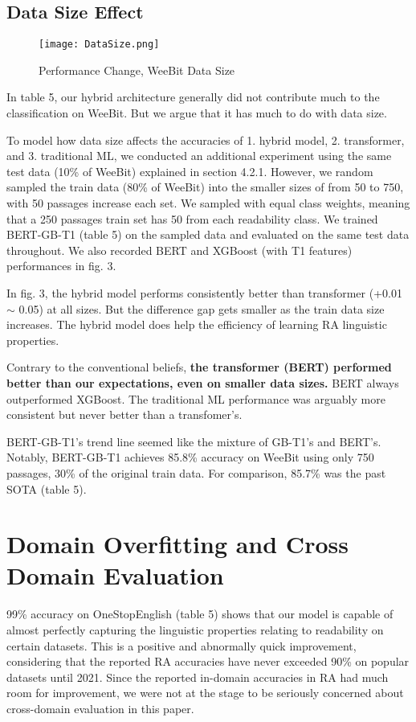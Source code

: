 \documentclass[11pt]{article}
\begin{document}
\subsection{Data Size Effect}
\begin{figure}
    \raggedright
    \texttt{[image: DataSize.png]}
    \caption{Performance Change, WeeBit Data Size}
    \label{fig:2}
\end{figure}
In table 5, our hybrid architecture generally did not contribute much to the classification on WeeBit. But we argue that it has much to do with data size.

To model how data size affects the accuracies of 1. hybrid model, 2. transformer, and 3. traditional ML, we conducted an additional experiment using the same test data (10\% of WeeBit) explained in section 4.2.1. However, we random sampled the train data (80\% of WeeBit) into the smaller sizes of from 50 to 750, with 50 passages increase each set. We sampled with equal class weights, meaning that a 250 passages train set has 50 from each readability class. We trained BERT-GB-T1 (table 5) on the sampled data and evaluated on the same test data throughout. We also recorded BERT and XGBoost (with T1 features) performances in fig. 3.

In fig. 3, the hybrid model performs consistently better than transformer (+0.01 $\sim$ 0.05) at all sizes. But the difference gap gets smaller as the train data size increases. The hybrid model does help the efficiency of learning RA linguistic properties. 

Contrary to the conventional beliefs, \textbf{the transformer (BERT) performed better than our expectations, even on smaller data sizes.} BERT always outperformed XGBoost. The traditional ML performance was arguably more consistent but never better than a transfomer's.

BERT-GB-T1's trend line seemed like the mixture of GB-T1's and BERT's. Notably, BERT-GB-T1 achieves 85.8\% accuracy on WeeBit using only 750 passages, 30\% of the original train data. For comparison, 85.7\% was the past SOTA (table 5).

\section{Domain Overfitting and Cross Domain Evaluation}
99\% accuracy on OneStopEnglish (table 5) shows that our model is capable of almost perfectly capturing the linguistic properties relating to readability on certain datasets. This is a positive and abnormally quick improvement, considering that the reported RA accuracies have never exceeded 90\% on popular datasets \citep{Vajjala:12, xu2015problems, Xia:16, Vajjala:18} until 2021. Since the reported in-domain accuracies in RA had much room for improvement, we were not at the stage to be seriously concerned about cross-domain evaluation \citep{vstajner2018detailed} in this paper. 
\end{document}
